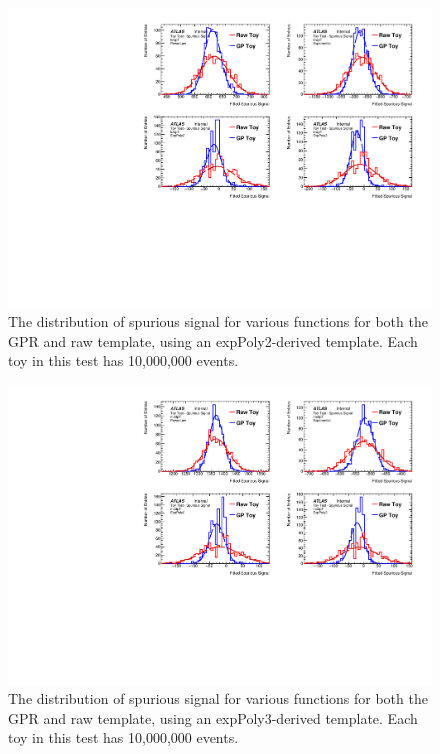 \begin{figure} 
\begin{center}
  \includegraphics[width=\textwidth]{figures/background/gpr/validation/nominal/ToyTest_FitSigVals_lowpT_10M_noSig}   
\caption{The distribution of spurious signal for various functions for both the GPR and raw template, using an expPoly2-derived template. Each toy in this test has 10,000,000 events.}
\label{fig:lowpt_10M_noSig}
\end{center}
\end{figure}

\begin{figure} 
\begin{center}
  \includegraphics[width=\textwidth]{figures/background/gpr/validation/nominal/ToyTest_FitSigVals_medpT_10M_noSig}   
\caption{The distribution of spurious signal for various functions for both the GPR and raw template, using an expPoly3-derived template. Each toy in this test has 10,000,000 events.}
\label{fig:medpt_10M_noSig}
\end{center}
\end{figure}

